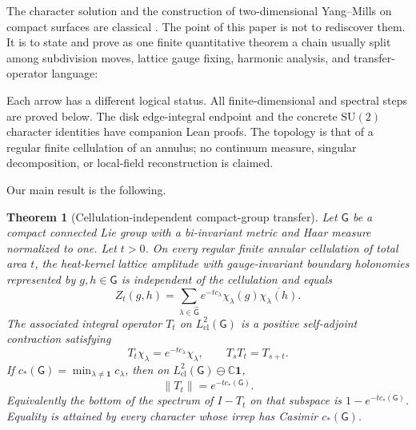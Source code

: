 \documentclass[11pt]{article}
\newtheorem{theorem}{Theorem}[section]
\theoremstyle{remark}
\newcommand{\SU}{\mathrm{SU}(2)}
\newcommand{\G}{\mathsf G}
\newcommand{\HclG}{L^2_{\mathrm{cl}}(\G)}
\begin{document}
The character solution and the construction of two-dimensional Yang--Mills on
compact surfaces are classical \cite{Witten1991,Sengupta1997,Levy2003}.  The
point of this paper is not to rediscover them.  It is to state and prove as one
finite quantitative theorem a chain usually split among subdivision moves,
lattice gauge fixing, harmonic analysis, and transfer-operator language:
\begin{center}
\end{center}
Each arrow has a different logical status.  All finite-dimensional and
spectral steps are proved below.  The disk edge-integral endpoint and the
concrete $\SU$ character identities have companion Lean proofs.  The topology
is that of a regular finite cellulation of an annulus; no continuum measure,
singular decomposition, or local-field reconstruction is claimed.

Our main result is the following.

\begin{theorem}[Cellulation-independent compact-group transfer]\label{thm:main}
Let $\G$ be a compact connected Lie group with a bi-invariant metric and Haar
measure normalized to one.  Let $t>0$.  On every regular finite annular
cellulation of total area $t$, the heat-kernel lattice amplitude with
gauge-invariant boundary holonomies represented by $g,h\in\G$ is independent
of the cellulation and equals
\begin{equation}\label{eq:class-kernel}
 Z_t(g,h)=\sum_{\lambda\in\widehat{\G}}e^{-tc_\lambda}
 \chi_\lambda(g)\overline{\chi_\lambda(h)}.
\end{equation}
The associated integral operator $T_t$ on $\HclG$ is a positive self-adjoint
contraction satisfying
\[
 T_t\chi_\lambda=e^{-tc_\lambda}\chi_\lambda,\qquad T_sT_t=T_{s+t}.
\]
If $c_*(\G)=\min_{\lambda\ne\mathbf1}c_\lambda$, then on
$\HclG\ominus\mathbb C\mathbf1$,
\begin{equation}\label{eq:sharp-norm}
 \|T_t\|=e^{-tc_*(\G)}.
\end{equation}
Equivalently the bottom of the spectrum of $I-T_t$ on that subspace is
$1-e^{-tc_*(\G)}$.  Equality is attained by every character whose irrep has
Casimir $c_*(\G)$.
\end{theorem}
\end{document}
